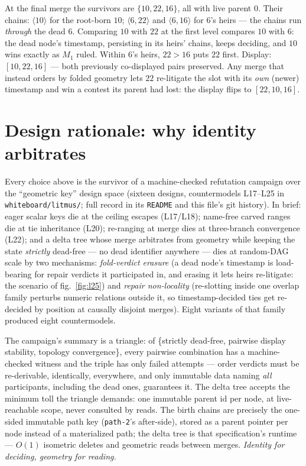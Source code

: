 \documentclass[11pt]{article}
\begin{document}
At the final merge the survivors are $\{10, 22, 16\}$, all with live
parent $0$. Their chains: $\langle 10 \rangle$ for the root-born $10$;
$\langle 6, 22 \rangle$ and $\langle 6, 16 \rangle$ for $6$'s heirs ---
the chains run \emph{through} the dead $6$. Comparing $10$ with $22$ at
the first level compares $10$ with $6$: the dead node's timestamp,
persisting in its heirs' chains, keeps deciding, and $10$ wins exactly as
$M_1$ ruled. Within $6$'s heirs, $22 > 16$ puts $22$ first. Display:
$[10, 22, 16]$ --- both previously co-displayed pairs preserved. Any
merge that instead orders by folded geometry lets $22$ re-litigate the
slot with its \emph{own} (newer) timestamp and win a contest its parent
had lost: the display flips to $[22, 10, 16]$.

\section{Design rationale: why identity arbitrates}
\label{sec:rationale}

Every choice above is the survivor of a machine-checked refutation
campaign over the ``geometric key'' design space (sixteen designs,
countermodels L17--L25 in \texttt{whiteboard/litmus/}; full record in its
\texttt{README} and this file's git history). In brief: eager scalar keys
die at the ceiling escapes (L17/L18); name-free carved ranges die at tie
inheritance (L20); re-ranging at merge dies at three-branch convergence
(L22); and a delta tree whose merge arbitrates from geometry while keeping
the state \emph{strictly} dead-free --- no dead identifier anywhere ---
dies at random-DAG scale by two mechanisms: \emph{fold-verdict erasure}
(a dead node's timestamp is load-bearing for repair verdicts it
participated in, and erasing it lets heirs re-litigate: the scenario of
fig.~\ref{fig:l25}) and \emph{repair non-locality} (re-slotting inside one
overlap family perturbs numeric relations outside it, so timestamp-decided
ties get re-decided by position at causally disjoint merges). Eight
variants of that family produced eight countermodels.

The campaign's summary is a triangle: of \{strictly dead-free, pairwise
display stability, topology convergence\}, every pairwise combination has
a machine-checked witness and the triple has only failed attempts ---
order verdicts must be re-derivable, identically, everywhere, and only
immutable data naming \emph{all} participants, including the dead ones,
guarantees it. The delta tree accepts the minimum toll the triangle
demands: one immutable parent id per node, at live-reachable scope, never
consulted by reads. The birth chains are precisely the one-sided immutable
path key (\texttt{path-2}'s after-side), stored as a parent pointer per
node instead of a materialized path; the delta tree is that
specification's runtime --- $O(1)$ isometric deletes and geometric reads
between merges. \emph{Identity for deciding, geometry for reading.}
\end{document}
